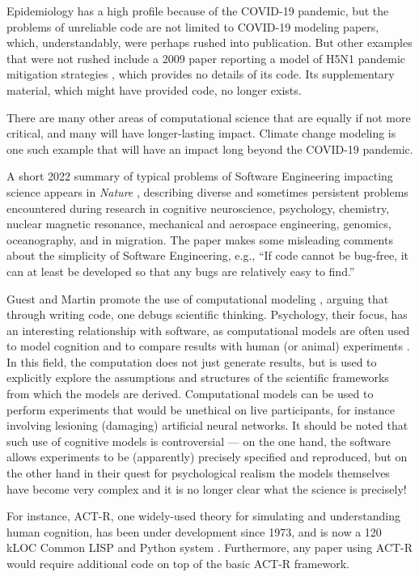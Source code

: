 \documentclass{comjnl}
\begin{document}
Epidemiology has a high profile because of the COVID-19 pandemic, but the problems of unreliable code are not limited to COVID-19 modeling papers, which, understandably, were perhaps rushed into publication. But other examples that were not rushed include a 2009 paper reporting a model of H5N1 pandemic mitigation strategies \cite{flu-model}, which provides no details of its code. Its supplementary material, which might have provided code, no longer exists.

There are many other areas of computational science that are equally if not more critical, and many will have longer-lasting impact. Climate change modeling is one such example that will have an impact long beyond the COVID-19 pandemic.

A short 2022 summary of typical problems of Software Engineering impacting science appears in \emph{Nature\/} \cite{nature-review}, describing diverse and sometimes persistent problems encountered during research in cognitive neuroscience, psychology, chemistry, nuclear magnetic resonance, mechanical and aerospace engineering, genomics, oceanography, and in migration. The paper \cite{nature-review}  makes some misleading comments about the simplicity of Software Engineering, e.g., ``If code cannot be bug-free, it can at least be developed so that any bugs are relatively easy to find.''

Guest and Martin promote the use of computational modeling \cite{psychological-modeling}, arguing that through writing code, one debugs scientific thinking. Psychology, their focus, has an interesting relationship with software, as computational models are often used to model cognition and to compare results with human (or animal) experiments \cite{psychological-modeling}. In this field, the computation does not just generate results, but is used to explicitly explore the assumptions and structures of the scientific frameworks from which the models are derived. Computational models can be used to perform experiments that would be unethical on live participants, for instance involving lesioning (damaging) artificial neural networks. It should be noted that such use of cognitive models is controversial --- on the one hand, the software allows experiments to be (apparently) precisely specified and reproduced, but on the other hand in their quest for psychological realism the models themselves have become very complex and it is no longer clear what the science is precisely!

For instance, ACT-R, one widely-used theory for simulating and understanding human cognition, has been under development since 1973, and is now a 120 kLOC Common LISP and Python system \cite{actr}. Furthermore, any paper using ACT-R would require additional code on top of the basic ACT-R framework.
\end{document}

